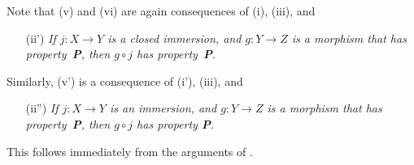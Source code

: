 \begin{env}[5.5.13]
\label{I.5.5.13}
Note that (v) and (vi) are again consequences of (i), (iii), and
\begin{enumerate}
  \item[(ii')] \emph{If $j:X\to Y$ is a closed immersion, and $g:Y\to Z$ is a morphism that has property~\textbf{P}, then $g\circ j$ has property~\textbf{P}}.
\end{enumerate}
Similarly, (v') is a consequence of (i'), (iii), and
\begin{enumerate}
  \item[(ii'')] \emph{If $j:X\to Y$ is an immersion, and $g:Y\to Z$ is a morphism that has property~\textbf{P}, then $g\circ j$ has property \textbf{P}}.
\end{enumerate}
This follows immediately from the arguments of .
\end{env}
